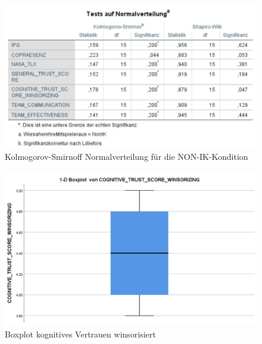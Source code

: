 \documentclass[a4paper,11pt]{article}%
\renewcommand{\\}{\vspace*{0.5\baselineskip} \newline}
\begin{document}
	\begin{figure}[H]
	\centering
		\begin{footnotesize}
			\includegraphics[scale=0.6]{Abbildungen/Post_QuestionnaireStatistiks/Normalverteilung_15_NON_IK}\\
			\caption{Kolmogorov-Smirnoff Normalverteilung für die NON-IK-Kondition}
			\label{fig:KolSmirIndNONIK}
		\end{footnotesize}
	\end{figure}	
	
	
\begin{figure}[H]
\centering
		\begin{footnotesize}
			\includegraphics[scale=0.5]{Abbildungen/Post_QuestionnaireStatistiks/boxplot_cognitive_trust_winsorisiert}\\
			\caption{Boxplot kognitives Vertrauen winsorisiert}
			\label{fig:boxplot_cognitive_trust_winsorisiert}
		\end{footnotesize}
	\end{figure}	
\end{document}
